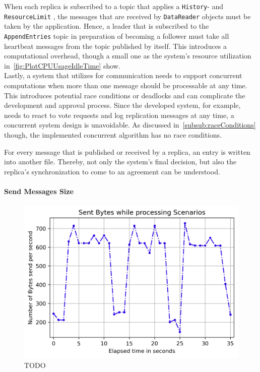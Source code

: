When each replica is subscribed to a topic that applies a \texttt{History}- and \texttt{ResourceLimit} , the messages that are received by \texttt{DataReader} objects must be taken by the application.
Hence, a leader that is subscribed to the \texttt{AppendEntries} topic in preparation of becoming a follower must take all heartbeat messages from the topic published by itself.
This introduces a computational overhead, though a small one as the system's resource utilization in~\autoref{fig:PlotCPUUsageIdleTime} show.
\\

Lastly, a system that utilizes  for communication needs to support concurrent computations when more than one message should be processable at any time.
This introduces potential race conditions or deadlocks and can complicate the development and approval process.
Since the developed system, for example, needs to react to vote requests and log replication messages at any time, a concurrent system design is unavoidable.
As discussed in~\autoref{subsub:raceConditions} though, the implemented concurrent algorithm has no race conditions.



\iffalse


For every message that is published or received by a replica, an entry is written into another file.
Thereby, not only the system's final decision, but also the replica's synchronization to come to an agreement can be understood.

\paragraph{Send Messages Size}
\begin{figure}[!htb]
	\centering
	\includegraphics[width=0.75\linewidth]{images/plots/scenarioProcessingMessageSize}
	\caption{TODO}
	\label{fig:messageSizeScenarioProcessing}
\end{figure}



